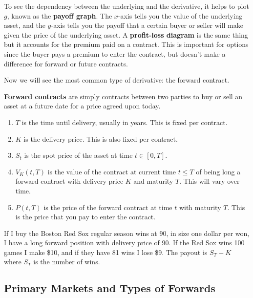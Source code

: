 \documentclass{article}
\begin{document}
    \begin{definition}
      To see the dependency between the underlying and the derivative, it helps to plot $g$, known as the \textbf{payoff graph}. The $x$-axis tells you the value of the underlying asset, and the $y$-axis tells you the payoff that a certain buyer or seller will make given the price of the underlying asset. 
      A \textbf{profit-loss diagram} is the same thing but it accounts for the premium paid on a contract. This is important for options since the buyer pays a premium to enter the contract, but doesn't make a difference for forward or future contracts. 
    \end{definition}

    Now we will see the most common type of derivative: the forward contract. 

    \begin{definition}
      \textbf{Forward contracts} are simply contracts between two parties to buy or sell an asset at a future date for a price agreed upon today. 
      \begin{enumerate}
        \item $T$ is the time until delivery, usually in years. This is fixed per contract.
        \item $K$ is the delivery price. This is also fixed per contract. 
        \item $S_t$ is the spot price of the asset at time $t \in [0, T]$.
        \item $V_K (t, T)$ is the value of the contract at current time $t \leq T$ of being long a forward contract with delivery price $K$ and maturity $T$. This will vary over time. 
        \item $P(t, T)$ is the price of the forward contract at time $t$ with maturity $T$. This is the price that you pay to enter the contract.
      \end{enumerate}
    \end{definition}

    \begin{example}
      If I buy the Boston Red Sox regular season wins at 90, in size one dollar per won, I have a long forward position with delivery price of 90. If the Red Sox wins 100 games I make \$10, and if they have 81 wins I lose \$9. The payout is $S_T - K$ where $S_T$ is the number of wins. 
    \end{example}

  \subsection{Primary Markets and Types of Forwards}
\end{document}
